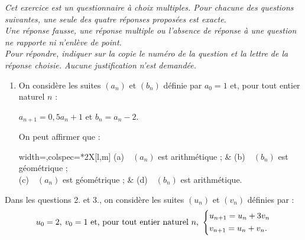 \emph{Cet exercice est un questionnaire à choix multiples. Pour chacune des questions suivantes, une seule des quatre réponses proposées est exacte.\\Une réponse fausse, une réponse multiple ou l'absence de réponse à une question ne rapporte ni n'enlève de point.\\Pour répondre, indiquer sur la copie le numéro de la question et la lettre de la réponse choisie. Aucune justification n'est demandée.}

\begin{enumerate}
	\item On considère les suites $\left(a_n\right)$ et $\left(b_n\right)$ définie par $a_0 = 1$ et, pour tout entier naturel $n$ :
	
	\hfill$a_{n+1} = 0,5a_n + 1$ et $b_n = a_n - 2$.\hfill~
	
	On peut affirmer que :
	
	\medskip
	
	\begin{tblr}{width=\linewidth,colspec={*{2}{X[l,m]}}}
		(a)~~$\left(a_n\right)$ est arithmétique ; & (b)~~$\left(b_n\right)$ est géométrique ; \\
		(c)~~$\left(a_n\right)$ est géométrique ; & (d)~~$\left(b_n\right)$ est arithmétique. \\
	\end{tblr}
\end{enumerate}
%
Dans les questions 2. et 3., on considère les suites $\left(u_n\right)$ et $\left(v_n\right)$ définies par : \[u_0 = 2,\: v_0 = 1 \text{ et, pour tout entier naturel } n \text{, } \begin{dcases} u_{n+1} = u_n + 3v_n \\ v_{n+1} = u_n + v_n. \end{dcases}\]
%
